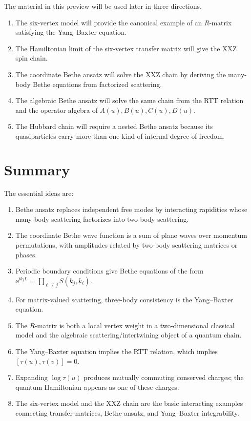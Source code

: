 The material in this preview will be used later in three directions.

\begin{enumerate}[label=(\roman*)]
    \item The six-vertex model will provide the canonical example of an
    $R$-matrix satisfying the Yang--Baxter equation.
    \item The Hamiltonian limit of the six-vertex transfer matrix will give the
    XXZ spin chain.
    \item The coordinate Bethe ansatz will solve the XXZ chain by deriving the
    many-body Bethe equations from factorized scattering.
    \item The algebraic Bethe ansatz will solve the same chain from the RTT
    relation and the operator algebra of $A(u),B(u),C(u),D(u)$.
    \item The Hubbard chain will require a nested Bethe ansatz because its
    quasiparticles carry more than one kind of internal degree of freedom.
\end{enumerate}

\section{Summary}
\label{sec:bethe-yang-baxter-summary}

The essential ideas are:
\begin{enumerate}[label=(\roman*)]
    \item Bethe ansatz replaces independent free modes by interacting rapidities
    whose many-body scattering factorizes into two-body scattering.
    \item The coordinate Bethe wave function is a sum of plane waves over
    momentum permutations, with amplitudes related by two-body scattering
    matrices or phases.
    \item Periodic boundary conditions give Bethe equations of the form
    $\ee^{\ii k_jL}=\prod_{\ell\neq j}S(k_j,k_\ell)$.
    \item For matrix-valued scattering, three-body consistency is the
    Yang--Baxter equation.
    \item The $R$-matrix is both a local vertex weight in a two-dimensional
    classical model and the algebraic scattering/intertwining object of a quantum
    chain.
    \item The Yang--Baxter equation implies the RTT relation, which implies
    $[\tau(u),\tau(v)]=0$.
    \item Expanding $\log\tau(u)$ produces mutually commuting conserved charges;
    the quantum Hamiltonian appears as one of these charges.
    \item The six-vertex model and the XXZ chain are the basic interacting
    examples connecting transfer matrices, Bethe ansatz, and Yang--Baxter
    integrability.
\end{enumerate}
